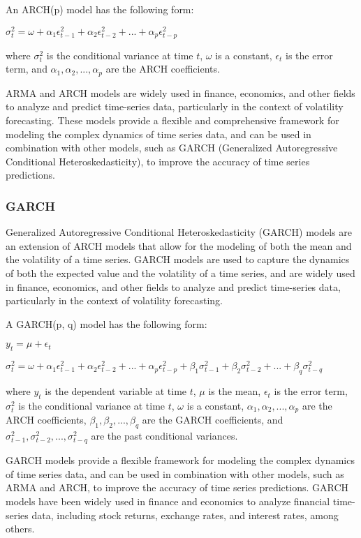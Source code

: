 \documentclass[12pt, a4paper, oneside]{article}
\begin{document}
An ARCH(p) model has the following form:

$\sigma_t^2 = \omega + \alpha_1 \epsilon_{t-1}^2 + \alpha_2 \epsilon_{t-2}^2 + ... + \alpha_p \epsilon_{t-p}^2$

where $\sigma_t^2$ is the conditional variance at time $t$, $\omega$ is a constant, $\epsilon_t$ is the error term, and $\alpha_1, \alpha_2, ..., \alpha_p$ are the ARCH coefficients.

ARMA and ARCH models are widely used in finance, economics, and other fields to analyze and predict time-series data, particularly in the context of volatility forecasting. These models provide a flexible and comprehensive framework for modeling the complex dynamics of time series data, and can be used in combination with other models, such as GARCH (Generalized Autoregressive Conditional Heteroskedasticity), to improve the accuracy of time series predictions.
\subsubsection{GARCH}
Generalized Autoregressive Conditional Heteroskedasticity (GARCH) models are an extension of ARCH models that allow for the modeling of both the mean and the volatility of a time series. GARCH models are used to capture the dynamics of both the expected value and the volatility of a time series, and are widely used in finance, economics, and other fields to analyze and predict time-series data, particularly in the context of volatility forecasting.

A GARCH(p, q) model has the following form:

$y_t = \mu + \epsilon_t$

$\sigma_t^2 = \omega + \alpha_1 \epsilon_{t-1}^2 + \alpha_2 \epsilon_{t-2}^2 + ... + \alpha_p \epsilon_{t-p}^2 + \beta_1 \sigma_{t-1}^2 + \beta_2 \sigma_{t-2}^2 + ... + \beta_q \sigma_{t-q}^2$

where $y_t$ is the dependent variable at time $t$, $\mu$ is the mean, $\epsilon_t$ is the error term, $\sigma_t^2$ is the conditional variance at time $t$, $\omega$ is a constant, $\alpha_1, \alpha_2, ..., \alpha_p$ are the ARCH coefficients, $\beta_1, \beta_2, ..., \beta_q$ are the GARCH coefficients, and $\sigma_{t-1}^2, \sigma_{t-2}^2, ..., \sigma_{t-q}^2$ are the past conditional variances.

GARCH models provide a flexible framework for modeling the complex dynamics of time series data, and can be used in combination with other models, such as ARMA and ARCH, to improve the accuracy of time series predictions. GARCH models have been widely used in finance and economics to analyze financial time-series data, including stock returns, exchange rates, and interest rates, among others.
\end{document}
